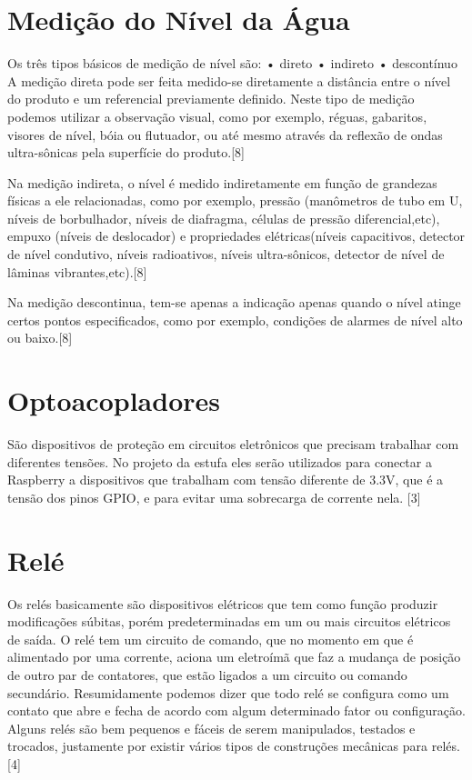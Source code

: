 \section{Medição do Nível da Água}

Os três tipos básicos de medição de nível são:
• direto
• indireto
• descontínuo
A medição direta pode ser feita medido-se diretamente a distância entre o nível do produto e um referencial previamente definido. Neste tipo de medição podemos utilizar a observação visual, como por exemplo, réguas, gabaritos, visores de nível, bóia ou flutuador, ou até mesmo através da reflexão de ondas ultra-sônicas pela superfície do produto.[8]

Na medição indireta, o nível é medido indiretamente em função de grandezas físicas a ele relacionadas, como por exemplo, pressão (manômetros de tubo em U, níveis de borbulhador, níveis de diafragma, células de pressão diferencial,etc), empuxo (níveis de deslocador) e propriedades elétricas(níveis capacitivos, detector de nível condutivo, níveis radioativos, níveis ultra-sônicos, detector de nível de lâminas vibrantes,etc).[8]

Na medição descontinua, tem-se apenas a indicação apenas quando o nível atinge certos pontos especificados, como por exemplo, condições de alarmes de nível alto ou baixo.[8]

\section{Optoacopladores}

São dispositivos de proteção em circuitos eletrônicos que precisam trabalhar com diferentes tensões. No projeto da estufa eles serão utilizados para conectar a Raspberry a dispositivos que trabalham com tensão diferente de 3.3V, que é a tensão dos pinos GPIO, e para evitar uma sobrecarga de corrente nela.  [3]

\section{Relé}

Os relés basicamente são dispositivos elétricos que tem como função produzir modificações súbitas, porém predeterminadas em um ou mais circuitos elétricos de saída. O relé tem um circuito de comando, que no momento em que é alimentado por uma corrente, aciona um eletroímã que faz a mudança de posição de outro par de contatores, que estão ligados a um circuito ou comando secundário. Resumidamente podemos dizer que todo relé se configura como um contato que abre e fecha de acordo com algum determinado fator ou configuração. Alguns relés são bem pequenos e fáceis de serem manipulados, testados e trocados, justamente por existir vários tipos de construções mecânicas para relés. [4]

